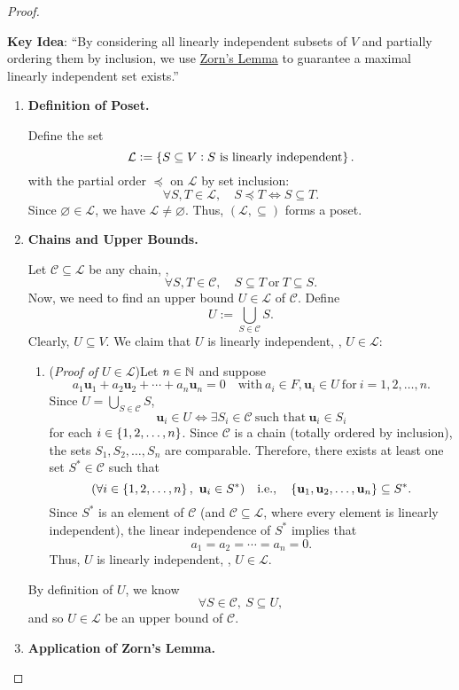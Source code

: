 \documentclass[11pt,openany]{article}
\renewcommand{\vec}[1]{\mathbf{#1}}
\begin{document}
\newpage
{}
\begin{proof}
\ \begin{flushleft}\color{red}
\textbf{Key Idea}: ``By considering all linearly independent subsets of \(V\) and partially ordering them by inclusion, we use \underline{Zorn's Lemma} to guarantee a maximal linearly independent set exists.''
\end{flushleft}
\begin{enumerate}[Step 1]
	\item \textbf{Definition of Poset.}
	
	Define the set \[
	\mathcal{L}:=\set{S\subseteq V:\text{$S$ is linearly independent}}.
	\] with the partial order $\preceq$ on $\mathcal{L}$ by set inclusion: \[
	\forall S,T\in\mathcal{L},\quad S\preceq T\iff S\subseteq T.
	\] Since $\varnothing\in\mathcal{L}$, we have $\mathcal{L}\neq\varnothing$. Thus, $(\mathcal{L},\subseteq)$ forms a poset.
	\item \textbf{Chains and Upper Bounds.}
	
	Let $\mathcal{C}\subseteq\mathcal{L}$ be any chain, \ie, \[
	\forall S,T\in\mathcal{C},\quad S\subseteq T\ \text{or}\ T\subseteq S.
	\] Now, we need to find an upper bound $U\in\mathcal{L}$ of $\mathcal{C}$. Define \[
	U:=\bigcup_{S\in\mathcal{C}}S.
	\] Clearly, $U\subseteq V$. We claim that $U$ is linearly independent, \ie, $U\in\mathcal{L}$:
	\begin{enumerate}
		\item[] (\textit{Proof of $U\in\mathcal{L}$})\quad Let $n\in\mathbb{N}$ and suppose \[
		a_1\vec{u}_1+a_2\vec{u}_2+\cdots+a_n\vec{u}_n=0\quad\text{with}\ a_i\in F, \vec{u}_i\in U\ \text{for}\ i=1,2,\dots,n.
		\] Since $U=\bigcup_{S\in\mathcal{C}}S$, \[
		\vec{u}_i\in U\iff \exists S_i\in\mathcal{C}\ \text{such that}\ \vec{u}_i\in S_i
		\] for each $i\in\set{1,2,\dots,n}$. Since $\mathcal{C}$ is a chain (totally ordered by inclusion), the sets $S_1,S_2,\dots,S_n$ are comparable. Therefore, there exists at least one set $S^*\in\mathcal{C}$ such that \[
		(\forall i\in\set{1,2,\dots,n},\ \vec{u}_i\in S^*)\quad\ie,\quad\set{\vec{u}_1,\vec{u}_2,\dots,\vec{u}_n}\subseteq S^*.
		\] Since $S^*$ is an element of $\mathcal{C}$ (and $\mathcal{C}\subseteq\mathcal{L}$, where every element is linearly independent), the linear independence of $S^*$ implies that \[
		a_1=a_2=\cdots=a_n=0.
		\] Thus, $U$ is linearly independent, \ie, $U\in\mathcal{L}$.
	\end{enumerate}
	 By definition of $U$, we know \[
	 \forall S\in\mathcal{C},\ S\subseteq U,
	 \] and so $U\in\mathcal{L}$ be an upper bound of $\mathcal{C}$.
	\item \textbf{Application of Zorn's Lemma.}
	

\end{enumerate}
\end{proof}
\end{document}
